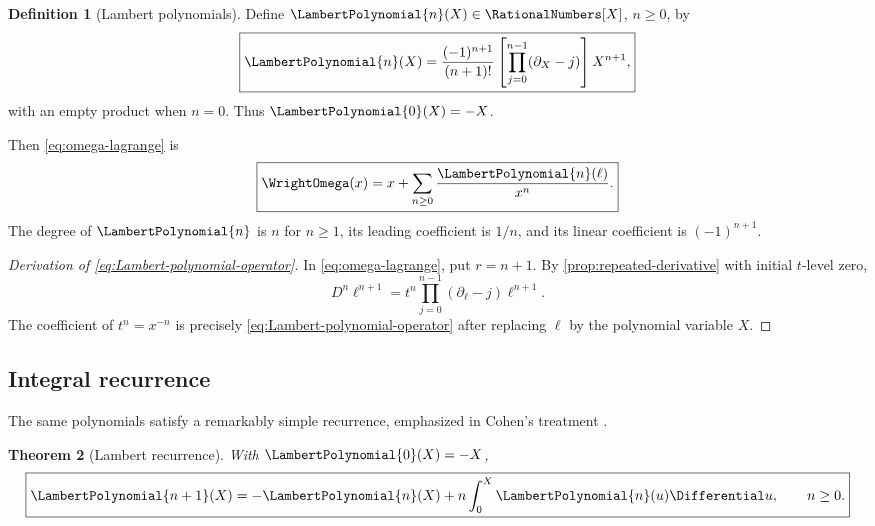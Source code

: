 \documentclass[11pt,oneside]{article}
\numberwithin{equation}{section}
\newtheorem{theorem}{Theorem}[section]
\theoremstyle{definition}
\newtheorem{definition}[theorem]{Definition}
\newcommand{\dlog}{\partial_{\ell}}
\begin{document}
\begin{definition}[Lambert polynomials]
Define \(\LambertPolynomial{n}(X)\in\RationalNumbers[X]\), \(n\ge0\), by
\begin{equation}\label{eq:Lambert-polynomial-operator}
\boxed{
  \LambertPolynomial{n}(X)=\frac{(-1)^{n+1}}{(n+1)!}
  \left[\prod_{j=0}^{n-1}(\partial_X-j)\right]X^{n+1},
}
\end{equation}
with an empty product when \(n=0\).  Thus \(\LambertPolynomial{0}(X)=-X\).
\end{definition}

Then \eqref{eq:omega-lagrange} is
\begin{equation}\label{eq:omega-Ln}
\boxed{
  \WrightOmega(x)=x+\sum_{n\ge0}\frac{\LambertPolynomial{n}(\ell)}{x^n}.
}
\end{equation}
The degree of \(\LambertPolynomial{n}\) is \(n\) for \(n\ge1\), its leading coefficient is
\(1/n\), and its linear coefficient is \((-1)^{n+1}\).

\begin{proof}[Derivation of \eqref{eq:Lambert-polynomial-operator}]
In \eqref{eq:omega-lagrange}, put \(r=n+1\).  By
\cref{prop:repeated-derivative} with initial \(t\)-level zero,
\[
  D^n\ell^{n+1}
  =t^n\prod_{j=0}^{n-1}(\dlog-j)\ell^{n+1}.
\]
The coefficient of \(t^n=x^{-n}\) is precisely
\eqref{eq:Lambert-polynomial-operator} after replacing \(\ell\) by the
polynomial variable \(X\).
\end{proof}

\subsection{Integral recurrence}

The same polynomials satisfy a remarkably simple recurrence, emphasized in
Cohen's treatment \cite{CohenLambert}.

\begin{theorem}[Lambert recurrence]\label{thm:Lambert-recurrence}
With \(\LambertPolynomial{0}(X)=-X\),
\begin{equation}\label{eq:Lambert-recurrence}
\boxed{
  \LambertPolynomial{n+1}(X)=-\LambertPolynomial{n}(X)+n\int_0^X \LambertPolynomial{n}(u)\Differential u,
  \qquad n\ge0.
}
\end{equation}
\end{theorem}
\end{document}
